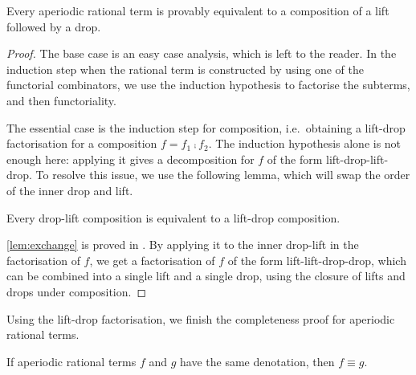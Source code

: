 \begin{lemma}\label{lem:lift-then-drop}
	Every aperiodic rational term is provably equivalent to a composition of a lift followed by a drop.
\end{lemma}
\begin{proof}
The  base case is an easy case analysis, which is left to the reader. In the induction step when the rational term is constructed by using one of the functorial combinators, we use the induction hypothesis to factorise the subterms, and then functoriality.

The essential case is the induction step for composition, i.e.~obtaining a lift-drop factorisation for a composition  $f = f_1 \comp f_2$. The induction hypothesis alone is not enough here: applying it gives  a decomposition for $f$ of the form lift-drop-lift-drop. To resolve this issue, we use the following lemma, which will swap the order of the inner drop and lift.
\begin{lemma}[Exchange]\label{lem:exchange} Every drop-lift composition is equivalent to a lift-drop composition.
\end{lemma}
\cref{lem:exchange} is proved in . By applying it to the inner drop-lift in the factorisation of $f$, we get a factorisation of $f$ of the form lift-lift-drop-drop, which can be combined into a single lift and a single drop, using the closure of lifts and drops under composition. 
\end{proof}

Using the lift-drop factorisation, we finish the completeness proof for aperiodic rational terms. 

\begin{corollary}\label{cor:aperiodic-completeness}
    If aperiodic rational terms $f$ and $g$ have the same denotation, then $f \equiv g$.
\end{corollary}

